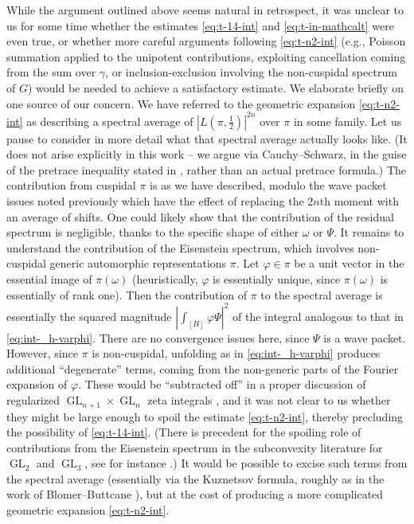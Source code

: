 \documentclass[reqno]{amsart}
\DeclareMathOperator{\GL}{GL}
\theoremstyle{plain} \newtheorem{theorem} {Theorem}
\theoremstyle{definition} \newtheorem{definition} [theorem] {Definition}
\theoremstyle{itplain} %
\numberwithin{equation}{section}
\numberwithin{theorem}{section}
\begin{document}
\begin{remark}
  While the argument outlined above seems natural in retrospect, it was unclear to us for some time whether the estimates \eqref{eq:t-14-int} and \eqref{eq:t-in-mathcalt} were even true, or whether more careful arguments following \eqref{eq:t-n2-int} (e.g., Poisson summation applied to the unipotent contributions, exploiting cancellation coming from the sum over $\gamma$, or inclusion-exclusion involving the non-cuspidal spectrum of $G$) would be needed to achieve a satisfactory estimate.  We elaborate briefly on one source of our concern.  We have referred to the geometric expansion \eqref{eq:t-n2-int} as describing a spectral average of $\left\lvert L(\pi,\tfrac{1}{2}) \right\rvert^{2 n}$ over $\pi$ in some family.  Let us pause to consider in more detail what that spectral average actually looks like.  (It does not arise explicitly in this work -- we argue via Cauchy--Schwarz, in the guise of the pretrace inequality stated in \cite[Lemma 5.5]{2020arXiv201202187N}, rather than an actual pretrace formula.)  The contribution from cuspidal $\pi$ is as we have described, modulo the wave packet issues noted previously which have the effect of replacing the $2n$th moment with an average of shifts.  One could likely show that the contribution of the residual spectrum is negligible, thanks to the specific shape of either $\omega$ or $\Psi$.  It remains to understand the contribution of the Eisenstein spectrum, which involves non-cuspidal generic automorphic representations $\pi$.  Let $\varphi \in \pi$ be a unit vector in the essential image of $\pi(\omega)$ (heuristically, $\varphi$ is essentially unique, since $\pi(\omega)$ is essentially of rank one).  Then the contribution of $\pi$ to the spectral average is essentially the squared magnitude $\left\lvert \int_{[H]} \varphi \Psi \right\rvert^2$ of the integral analogous to that in \eqref{eq:int-_h-varphi}.  There are no convergence issues here, since $\Psi$ is a wave packet.  However, since $\pi$ is non-cuspidal, unfolding as in \eqref{eq:int-_h-varphi} produces additional ``degenerate'' terms, coming from the non-generic parts of the Fourier expansion of $\varphi$.  These would be ``subtracted off'' in a proper discussion of regularized $\GL_{n+1} \times \GL_{n}$ zeta integrals \cite{MR3334892}, and it was not clear to us whether they might be large enough to spoil the estimate \eqref{eq:t-n2-int}, thereby precluding the possibility of \eqref{eq:t-14-int}.  (There is precedent for the spoiling role of contributions from the Eisenstein spectrum in the subconvexity literature for $\GL_2$ and $\GL_3$, see for instance \cite{MR1923476, MR3694659}.)  It would be possible to excise such terms from the spectral average (essentially via the Kuznetsov formula, roughly as in the work of Blomer--Buttcane \cite{MR4203038, MR4039487}), but at the cost of producing a more complicated geometric expansion \eqref{eq:t-n2-int}.
\end{remark}
\end{document}
